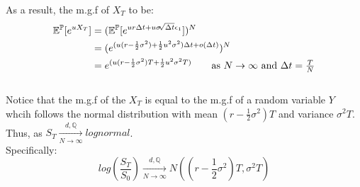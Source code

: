 \documentclass[12pt]{article}
\begin{document}
As a result, the m.g.f of $X_T$ to be:
\begin{align*}
  \mathbb{E}^\mathbb{P}[e^{u X_T}] &= (\mathbb{E}^\mathbb{P} [e^{u r\Delta t+u\sigma \sqrt[]{\Delta t} \epsilon_1}])^N \\
  &= (e^{(u(r-\frac{1}{2}\sigma^2) + \frac{1}{2}u^2\sigma^2) \Delta t + o(\Delta t)})^N\\
  &= e^{(u(r - \frac{1}{2}\sigma^2)T + \frac{1}{2}u^2 \sigma^2T)} \tag*{as $N \rightarrow \infty$ and $\Delta t = \frac{T}{N}$}
\end{align*}
\\
Notice that the m.g.f of the $X_T$ is equal to the m.g.f of a random variable $Y$ whcih follows the normal distribution with mean $(r - \frac{1}{2}\sigma^2)T$ and
variance $\sigma^2 T$. Thus, as $S_T  \xrightarrow[N \rightarrow \infty]{d, \mathbb{Q}} lognormal$.\\
Specifically: 
\[ log(\frac{S_T}{S_0})  \xrightarrow[N \rightarrow \infty]{d, \mathbb{Q}} N((r - \frac{1}{2}\sigma^2)T,\sigma^2 T) \]
\end{document}
